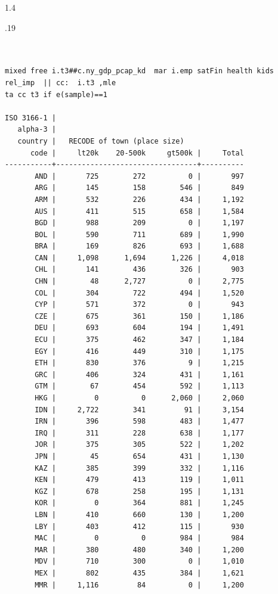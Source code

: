 \documentclass[10pt, letterpaper]{article}
\begin{document}
\begin{spacing}{1.4}
\begin{scriptsize}
\begin{spacing}{.19} 
\begin{verbatim}


mixed free i.t3##c.ny_gdp_pcap_kd  mar i.emp satFin health kids rel_imp  || cc:  i.t3 ,mle
ta cc t3 if e(sample)==1

ISO 3166-1 |
   alpha-3 |
   country |   RECODE of town (place size)
      code |     lt20k    20-500k     gt500k |     Total
-----------+---------------------------------+----------
       AND |       725        272          0 |       997 
       ARG |       145        158        546 |       849 
       ARM |       532        226        434 |     1,192 
       AUS |       411        515        658 |     1,584 
       BGD |       988        209          0 |     1,197 
       BOL |       590        711        689 |     1,990 
       BRA |       169        826        693 |     1,688 
       CAN |     1,098      1,694      1,226 |     4,018 
       CHL |       141        436        326 |       903 
       CHN |        48      2,727          0 |     2,775 
       COL |       304        722        494 |     1,520 
       CYP |       571        372          0 |       943 
       CZE |       675        361        150 |     1,186 
       DEU |       693        604        194 |     1,491 
       ECU |       375        462        347 |     1,184 
       EGY |       416        449        310 |     1,175 
       ETH |       830        376          9 |     1,215 
       GRC |       406        324        431 |     1,161 
       GTM |        67        454        592 |     1,113 
       HKG |         0          0      2,060 |     2,060 
       IDN |     2,722        341         91 |     3,154 
       IRN |       396        598        483 |     1,477 
       IRQ |       311        228        638 |     1,177 
       JOR |       375        305        522 |     1,202 
       JPN |        45        654        431 |     1,130 
       KAZ |       385        399        332 |     1,116 
       KEN |       479        413        119 |     1,011 
       KGZ |       678        258        195 |     1,131 
       KOR |         0        364        881 |     1,245 
       LBN |       410        660        130 |     1,200 
       LBY |       403        412        115 |       930 
       MAC |         0          0        984 |       984 
       MAR |       380        480        340 |     1,200 
       MDV |       710        300          0 |     1,010 
       MEX |       802        435        384 |     1,621 
       MMR |     1,116         84          0 |     1,200 

\end{verbatim}
\end{spacing}
\end{scriptsize}
\end{spacing}
\end{document}

